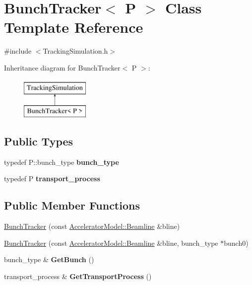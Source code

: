 \hypertarget{classBunchTracker}{}\section{Bunch\+Tracker$<$ P $>$ Class Template Reference}
\label{classBunchTracker}


{\ttfamily \#include $<$Tracking\+Simulation.\+h$>$}

Inheritance diagram for Bunch\+Tracker$<$ P $>$\+:\begin{figure}[H]
\begin{center}
\leavevmode
\includegraphics[height=2.000000cm]{classBunchTracker}
\end{center}
\end{figure}
\subsection*{Public Types}
\begin{DoxyCompactItemize}
\item 
\mbox{\label{classBunchTracker_a29e2137d8cc489998b6866707b1e326b}} 
typedef P\+::bunch\+\_\+type {\bfseries bunch\+\_\+type}
\item 
\mbox{\label{classBunchTracker_a169c5a919b7864192d34f96ae5ad0b5e}} 
typedef P {\bfseries transport\+\_\+process}
\end{DoxyCompactItemize}
\subsection*{Public Member Functions}
\begin{DoxyCompactItemize}
\item 
\hyperlink{classBunchTracker_a724b0e1b99f6b86e8ba7922461548e18}{Bunch\+Tracker} (const \hyperlink{classAcceleratorModel_1_1Beamline}{Accelerator\+Model\+::\+Beamline} \&bline)
\item 
\hyperlink{classBunchTracker_aac4546a7a80bd46d2e428836202e3bad}{Bunch\+Tracker} (const \hyperlink{classAcceleratorModel_1_1Beamline}{Accelerator\+Model\+::\+Beamline} \&bline, bunch\+\_\+type $\ast$bunch0)
\item 
\mbox{\label{classBunchTracker_abe4b943181ba4389901d7f2c608b8a63}} 
bunch\+\_\+type \& {\bfseries Get\+Bunch} ()
\item 
\mbox{\label{classBunchTracker_a99324bea77d070cf43028114544a9e61}} 
transport\+\_\+process \& {\bfseries Get\+Transport\+Process} ()
\end{DoxyCompactItemize}
